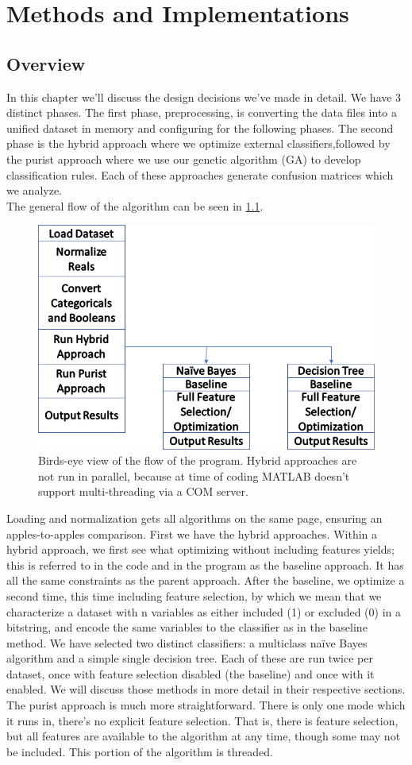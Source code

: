 \chapter{Methods and Implementations} \label{ch:Methods}
\section{Overview}
In this chapter we'll discuss the design decisions we've made in detail.  We
have 3 distinct phases.  The first phase, preprocessing, is converting the data files into a unified dataset in memory and configuring for the following phases.  The second phase is the hybrid approach where we optimize external classifiers,followed by the purist approach where we use our genetic algorithm (GA) to develop classification rules.  Each of these approaches generate confusion matrices which we analyze.\\
The general flow of the algorithm can be seen in \ref{fig:ProgramFlow}. 
\begin{figure}
	\centering
	\includegraphics[width=0.7\linewidth]{figures/png/ProgramFlow}
	\caption[Overall Program Flow]{Birds-eye view of the flow of the program.
		Hybrid approaches are not run in parallel, because at time of coding MATLAB
		doesn't support multi-threading via a COM server.}
	\label{fig:ProgramFlow}
\end{figure}
Loading and normalization gets all algorithms on the same page, ensuring an
apples-to-apples comparison.  First we have the hybrid approaches.  Within a
hybrid approach, we first see what optimizing without including features yields; this is referred to in the code and in the program as the baseline approach.  It
has all the same constraints as the parent approach.  After the baseline, we
optimize a second time, this time including feature selection, by which we mean
that we characterize a dataset with n variables as either included (1) or
excluded (0) in a bitstring, and encode the same variables to the classifier as
in the baseline method.  We have selected two distinct classifiers: a multiclass
na\"ive Bayes algorithm and a simple single decision tree.  Each of these are
run twice per dataset, once with feature selection disabled (the baseline) and
once with it enabled.  We will discuss those methods in more detail in their
respective sections.\\The purist approach is much more straightforward.  There
is only one mode which it runs in, there's no explicit feature selection.  That
is, there is feature selection, but all features are available to the algorithm
at any time, though some may not be included. This portion of the algorithm
is threaded.  
